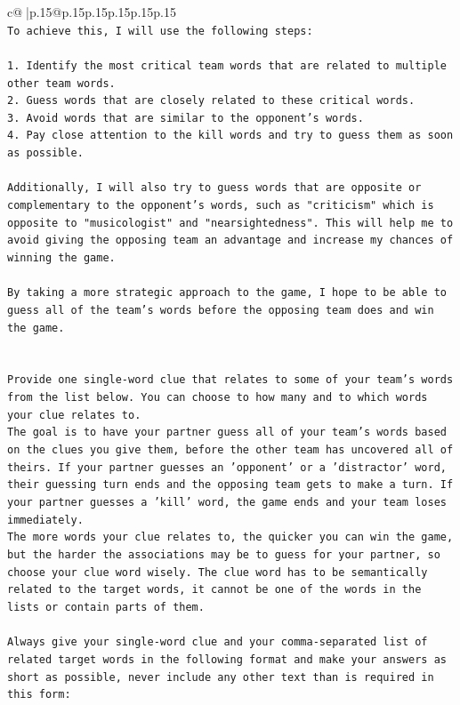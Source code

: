 \documentclass{article}
\begin{document}
{\begin{supertabular}{c@{$\;$}|p{.15\linewidth}@{}p{.15\linewidth}p{.15\linewidth}p{.15\linewidth}p{.15\linewidth}p{.15\linewidth}}
{{{\\ 
\texttt{To achieve this, I will use the following steps:} \\
\\ 
\texttt{1. Identify the most critical team words that are related to multiple other team words.} \\
\texttt{2. Guess words that are closely related to these critical words.} \\
\texttt{3. Avoid words that are similar to the opponent's words.} \\
\texttt{4. Pay close attention to the kill words and try to guess them as soon as possible.} \\
\\ 
\texttt{Additionally, I will also try to guess words that are opposite or complementary to the opponent's words, such as "criticism" which is opposite to "musicologist" and "nearsightedness". This will help me to avoid giving the opposing team an advantage and increase my chances of winning the game.} \\
\\ 
\texttt{By taking a more strategic approach to the game, I hope to be able to guess all of the team's words before the opposing team does and win the game.} \\
\\ 
\\ 
\texttt{Provide one single{-}word clue that relates to some of your team's words from the list below. You can choose to how many and to which words your clue relates to.} \\
\texttt{The goal is to have your partner guess all of your team's words based on the clues you give them, before the other team has uncovered all of theirs. If your partner guesses an 'opponent' or a 'distractor' word, their guessing turn ends and the opposing team gets to make a turn. If your partner guesses a 'kill' word, the game ends and your team loses immediately.} \\
\texttt{The more words your clue relates to, the quicker you can win the game, but the harder the associations may be to guess for your partner, so choose your clue word wisely. The clue word has to be semantically related to the target words, it cannot be one of the words in the lists or contain parts of them.} \\
\\ 
\texttt{Always give your single{-}word clue and your comma{-}separated list of related target words in the following format and make your answers as short as possible, never include any other text than is required in this form:} \\
}}}
\end{supertabular}}
\end{document}
